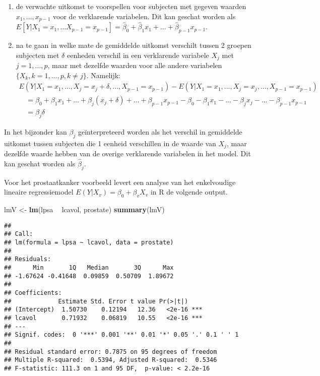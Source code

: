 \documentclass[12pt,dutch,coursenotes]{book}
\newenvironment{Shaded}{\begin{snugshade}}{\end{snugshade}}
\newcommand{\KeywordTok}[1]{\textcolor[rgb]{0.13,0.29,0.53}{\textbf{#1}}}
\newcommand{\StringTok}[1]{\textcolor[rgb]{0.31,0.60,0.02}{#1}}
\newcommand{\OperatorTok}[1]{\textcolor[rgb]{0.81,0.36,0.00}{\textbf{#1}}}
\newcommand{\NormalTok}[1]{#1}
\providecommand{\tightlist}{%
  \setlength{\itemsep}{0pt}\setlength{\parskip}{0pt}}
\theoremstyle{definition}
\theoremstyle{definition}
\theoremstyle{definition}
\theoremstyle{remark}
\begin{document}
\begin{enumerate}
\def\labelenumi{\arabic{enumi}.}
\tightlist
\item
  de verwachte uitkomst te voorspellen voor subjecten met gegeven
  waarden \(x_1,...,x_{p-1}\) voor de verklarende variabelen. Dit kan
  geschat worden als
  \(E[Y\vert X_1=x_1, \ldots X_{p-1}=x_{p-1}]=\hat{\beta}_0+\hat{\beta}_1x_1+...+\hat{\beta}_{p-1}x_{p-1}\).
\item
  na te gaan in welke mate de gemiddelde uitkomst verschilt tussen 2
  groepen subjecten met \(\delta\) eenheden verschil in een verklarende
  variabele \(X_j\) met \(j=1,\ldots,p\), maar met dezelfde waarden voor
  alle andere variabelen \(\{X_k,k=1,...,p,k\ne j\}\). Namelijk: \[
  \begin{array}{l}
  E(Y|X_1=x_1,...,X_j=x_j+\delta,...,X_{p-1}=x_{p-1}) - E(Y|X_1=x_1,...,X_j=x_j,...,X_{p-1}=x_{p-1}) \\
  \quad =\beta_0 + \beta_1 x_1 + ... + \beta_j(x_j+\delta)+...+\beta_{p-1} x_{p-1} - \beta_0 - \beta_1 x_1 - ... - \beta_jx_j-...-\beta_{p-1} x_{p-1} \\
  \quad= \beta_j\delta
  \end{array}
  \]
\end{enumerate}

In het bijzonder kan \(\beta_j\) geïnterpreteerd worden als het verschil
in gemiddelde uitkomst tussen subjecten die 1 eenheid verschillen in de
waarde van \(X_j\), maar dezelfde waarde hebben van de overige
verklarende variabelen in het model. Dit kan geschat worden als
\(\hat{\beta}_j\).

Voor het prostaatkanker voorbeeld levert een analyse van het
enkelvoudige lineaire regressiemodel \(E(Y|X_v)=\beta_0+\beta_v X_v\) in
R de volgende output.

\begin{Shaded}
\begin{Highlighting}[]
\NormalTok{lmV <-}\StringTok{ }\KeywordTok{lm}\NormalTok{(lpsa }\OperatorTok{~}\StringTok{ }\NormalTok{lcavol, prostate)}
\KeywordTok{summary}\NormalTok{(lmV)}
\end{Highlighting}
\end{Shaded}

\begin{verbatim}
## 
## Call:
## lm(formula = lpsa ~ lcavol, data = prostate)
## 
## Residuals:
##      Min       1Q   Median       3Q      Max 
## -1.67624 -0.41648  0.09859  0.50709  1.89672 
## 
## Coefficients:
##             Estimate Std. Error t value Pr(>|t|)    
## (Intercept)  1.50730    0.12194   12.36   <2e-16 ***
## lcavol       0.71932    0.06819   10.55   <2e-16 ***
## ---
## Signif. codes:  0 '***' 0.001 '**' 0.01 '*' 0.05 '.' 0.1 ' ' 1
## 
## Residual standard error: 0.7875 on 95 degrees of freedom
## Multiple R-squared:  0.5394, Adjusted R-squared:  0.5346 
## F-statistic: 111.3 on 1 and 95 DF,  p-value: < 2.2e-16
\end{verbatim}
\end{document}
